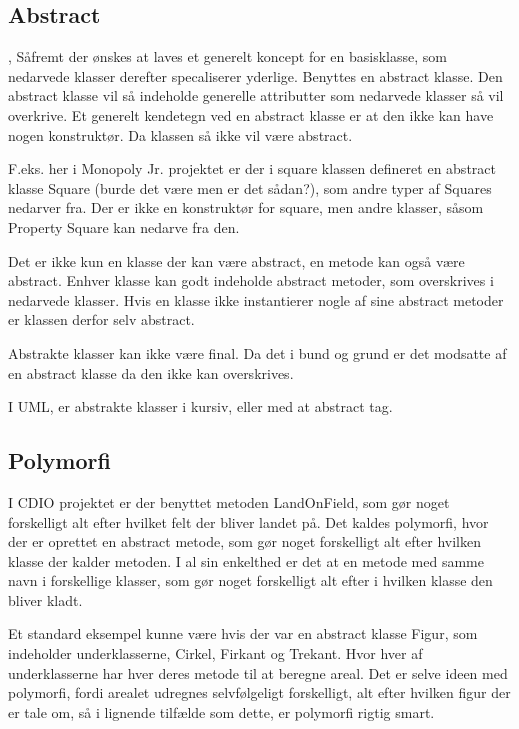 \documentclass[../main.tex]{subfiles}
\begin{document}
\subsection{Abstract}
,
Såfremt der ønskes at laves et generelt koncept for en basisklasse, som nedarvede klasser derefter specaliserer yderlige. Benyttes en abstract klasse. Den abstract klasse vil så indeholde generelle attributter som nedarvede klasser så vil overkrive. Et generelt kendetegn ved en abstract klasse er at den ikke kan have nogen konstruktør. Da klassen så ikke vil være abstract. 

F.eks. her i Monopoly Jr. projektet er der i square klassen defineret en abstract klasse Square (burde det være men er det sådan?), som andre typer af Squares nedarver fra. Der er ikke en konstruktør for square, men andre klasser, såsom Property Square kan nedarve fra den. 

Det er ikke kun en klasse der kan være abstract, en metode kan også være abstract. Enhver klasse kan godt indeholde abstract metoder, som overskrives i nedarvede klasser. Hvis en klasse ikke instantierer nogle af sine abstract metoder er klassen derfor selv abstract. 

Abstrakte klasser kan ikke være final. Da det i bund og grund er det modsatte af en abstract klasse da den ikke kan overskrives.

I UML, er abstrakte klasser i kursiv, eller med at abstract tag.

\subsection{Polymorfi}

I CDIO projektet er der benyttet metoden LandOnField, som gør noget forskelligt alt efter hvilket felt der bliver landet på. Det kaldes polymorfi, hvor der er oprettet en abstract metode, som gør noget forskelligt alt efter hvilken klasse der kalder metoden. I al sin enkelthed er det at en metode med samme navn i forskellige klasser, som gør noget forskelligt alt efter i hvilken klasse den bliver kladt.

Et standard eksempel kunne være hvis der var en abstract klasse Figur, som indeholder underklasserne, Cirkel, Firkant og Trekant. Hvor hver af underklasserne har hver deres metode til at beregne areal. Det er selve ideen med polymorfi, fordi arealet udregnes selvfølgeligt forskelligt, alt efter hvilken figur der er tale om, så i lignende tilfælde som dette, er polymorfi rigtig smart.
\end{document}
